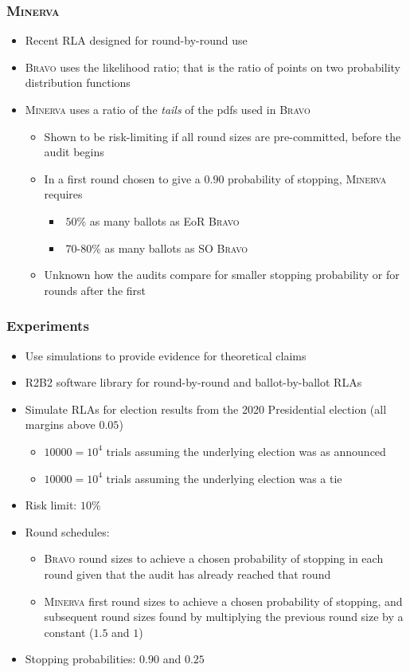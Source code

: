 \documentclass{beamer}
\newcommand{\Minerva}{\textsc{Minerva}\xspace}
\newcommand{\BRAVO}{\textsc{Bravo}\xspace}
\begin{document}
\begin{frame}
\frametitle{\Minerva}
\begin{itemize}
\item Recent RLA designed for round-by-round use
\pause 
\item \BRAVO uses the likelihood ratio; that is the ratio of points on two probability distribution functions
\pause 
\item \Minerva uses a ratio of the \emph{tails} of the pdfs used in \BRAVO
\pause 
\begin{itemize}
\item Shown to be risk-limiting if all round sizes are pre-committed, before the audit begins
\pause 
\item In a first round chosen to give a $0.90$ probability of stopping, \Minerva requires
\begin{itemize}
\item $~50\%$ as many ballots as EoR \BRAVO 
\item $~70\text{-}80\%$ as many ballots as SO \BRAVO 
\end{itemize}
\pause 
\item Unknown how the audits compare for smaller stopping probability or for rounds after the first
\end{itemize}
\end{itemize}
\end{frame}

\begin{frame}
\frametitle{Experiments}
\begin{itemize}
\item Use simulations to provide evidence for theoretical claims
\pause 
\item R2B2 software library for round-by-round and ballot-by-ballot RLAs
\pause 
\item Simulate RLAs for election results from the 2020 Presidential election (all margins above $0.05$)
\begin{itemize}
\item $10000=10^4$ trials assuming the underlying election was as announced
\item $10000=10^4$ trials assuming the underlying election was a tie
\end{itemize}
\pause 
\item Risk limit: $10\%$
\pause 
\item Round schedules:
\begin{itemize}
\item \BRAVO round sizes to achieve a chosen probability of stopping in each round given that the audit has already reached that round
\pause 
\item \Minerva first round sizes to achieve a chosen probability of stopping, and subsequent round sizes found by multiplying the previous round size by a constant ($1.5$ and $1$)
\end{itemize}
\pause 
\item Stopping probabilities: $0.90$ and $0.25$
\end{itemize}
\end{frame}
\end{document}

